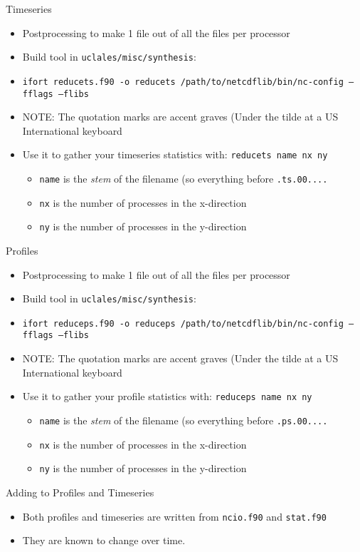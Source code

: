 \documentclass[handout]{beamer}
\newcommand{\code}[1]{{\tt #1}}
\begin{document}
\begin{frame}{Timeseries}
\begin{itemize}
 \item  Postprocessing to make 1 file out of all the files per processor
 \item Build tool in \code{uclales/misc/synthesis}: 
 \item \code{ifort reducets.f90 -o reducets \textasciigrave /path/to/netcdflib/bin/nc-config --fflags --flibs \textasciigrave }
 \item \alert{NOTE: The quotation marks are accent graves (Under the tilde at a US International keyboard}
  \item Use it to gather your timeseries statistics with:
\code{reducets name nx ny}
\begin{itemize}
 \item \code{name} is the \emph{stem} of the filename (so everything before \code{.ts.00....}
 \item  \code{nx} is the number of processes in the x-direction
 \item \code{ny} is the number of processes in the y-direction
\end{itemize}
\end{itemize}
\end{frame}

\begin{frame}{Profiles}
\begin{itemize}
 \item  Postprocessing to make 1 file out of all the files per processor
 \item Build tool in \code{uclales/misc/synthesis}: 
 \item \code{ifort reduceps.f90 -o reduceps \textasciigrave /path/to/netcdflib/bin/nc-config --fflags --flibs \textasciigrave }
 \item \alert{NOTE: The quotation marks are accent graves (Under the tilde at a US International keyboard}
  \item Use it to gather your profile statistics with: \code{reduceps name nx ny}
\begin{itemize}
 \item \code{name} is the \emph{stem} of the filename (so everything before \code{.ps.00....}
 \item  \code{nx} is the number of processes in the x-direction
 \item \code{ny} is the number of processes in the y-direction
\end{itemize}
\end{itemize}
\end{frame}
\begin{frame}{Adding to Profiles and Timeseries}
 \begin{itemize}
  \item Both profiles and timeseries are written from \code{ncio.f90} and \code{stat.f90}
  \item They are known to change over time. 
 \end{itemize}

\end{frame}
\end{document}
